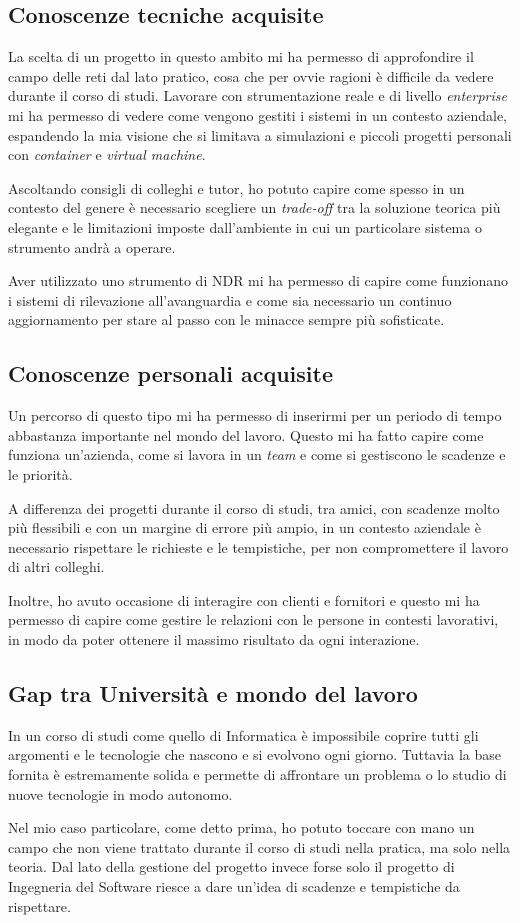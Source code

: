 \subsection{Conoscenze tecniche acquisite}

La scelta di un progetto in questo ambito mi ha permesso di approfondire il campo delle reti dal lato pratico, cosa che per ovvie ragioni è difficile da vedere durante il corso di studi. Lavorare con strumentazione reale e di livello \emph{enterprise} mi ha permesso di vedere come vengono gestiti i sistemi in un contesto aziendale, espandendo la mia visione che si limitava a simulazioni e piccoli progetti personali con \emph{container} e \emph{virtual machine}.

Ascoltando consigli di colleghi e tutor, ho potuto capire come spesso in un contesto del genere è necessario scegliere un \emph{trade-off} tra la soluzione teorica più elegante e le limitazioni imposte dall'ambiente in cui un particolare sistema o strumento andrà a operare.

Aver utilizzato uno strumento di NDR mi ha permesso di capire come funzionano i sistemi di rilevazione all'avanguardia e come sia necessario un continuo aggiornamento per stare al passo con le minacce sempre più sofisticate. 

\subsection{Conoscenze personali acquisite}

Un percorso di questo tipo mi ha permesso di inserirmi per un periodo di tempo abbastanza importante nel mondo del lavoro. Questo mi ha fatto capire come funziona un'azienda, come si lavora in un \emph{team} e come si gestiscono le scadenze e le priorità.

A differenza dei progetti durante il corso di studi, tra amici, con scadenze molto più flessibili e con un margine di errore più ampio, in un contesto aziendale è necessario rispettare le richieste e le tempistiche, per non compromettere il lavoro di altri colleghi.

Inoltre, ho avuto occasione di interagire con clienti e fornitori e questo mi ha permesso di capire come gestire le relazioni con le persone in contesti lavorativi, in modo da poter ottenere il massimo risultato da ogni interazione.

\subsection{Gap tra Università e mondo del lavoro}

In un corso di studi come quello di Informatica è impossibile coprire tutti gli argomenti e le tecnologie che nascono e si evolvono ogni giorno. Tuttavia la base fornita è estremamente solida e permette di affrontare un problema o lo studio di nuove tecnologie in modo autonomo.

Nel mio caso particolare, come detto prima, ho potuto toccare con mano un campo che non viene trattato durante il corso di studi nella pratica, ma solo nella teoria. Dal lato della gestione del progetto invece forse solo il progetto di Ingegneria del Software riesce a dare un'idea di scadenze e tempistiche da rispettare.